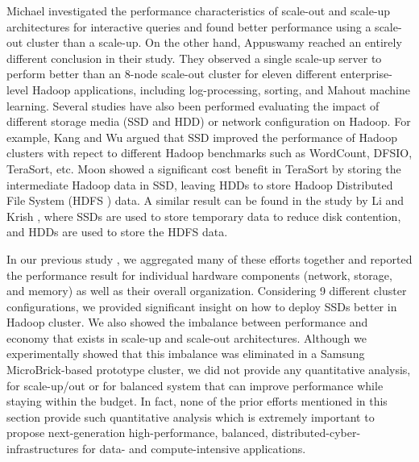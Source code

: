 \documentclass[journal]{IEEEtran}
\begin{document}
Michael \cite{scaleupscaleout:michael} investigated the performance characteristics of scale-out and scale-up architectures for interactive queries and found better performance using a scale-out cluster than a scale-up. On the other hand, Appuswamy \cite{scaleupscaleout:appuswamy} reached an entirely different conclusion in their study. They observed a single scale-up server to perform better than an 8-node scale-out cluster for eleven different enterprise-level Hadoop applications, including log-processing, sorting, and Mahout machine learning. Several studies have also been performed evaluating the impact of different storage media (SSD and HDD) or network configuration on Hadoop. For example, Kang \cite{ssdhdd:kang}  and Wu \cite{ssdhdd:wu} argued that SSD improved the performance of Hadoop clusters with repect to different Hadoop benchmarks such as WordCount, DFSIO, TeraSort, etc. Moon \cite{ssdhdd:moon} showed a significant cost benefit in TeraSort by storing the intermediate Hadoop data in SSD, leaving HDDs to store Hadoop Distributed File System (HDFS \cite{fw:hdfs}) data. A similar result can be found in the study by Li \cite{ssdhdd:li} and Krish \cite{ssdhdd:krish}, where SSDs are used to store temporary data to reduce disk contention, and HDDs are used to store the HDFS data. 

In our previous study \cite{scaleupscaleout:das2015evaluating}, we aggregated many of these efforts together and reported the performance result for individual hardware components (network, storage, and memory) as well as their overall organization. Considering 9 different cluster configurations, we provided significant insight on  how to deploy SSDs better in Hadoop cluster. We also showed the imbalance between performance and economy that exists in scale-up and scale-out architectures. Although we experimentally showed that this imbalance was eliminated in a Samsung MicroBrick-based prototype cluster, we did not provide any quantitative analysis, for scale-up/out or for balanced system that can improve performance while staying within the budget. In fact, none of the prior efforts mentioned in this section provide such quantitative analysis which is extremely important to propose next-generation high-performance, balanced, distributed-cyber-infrastructures for data- and compute-intensive applications.
\end{document}
